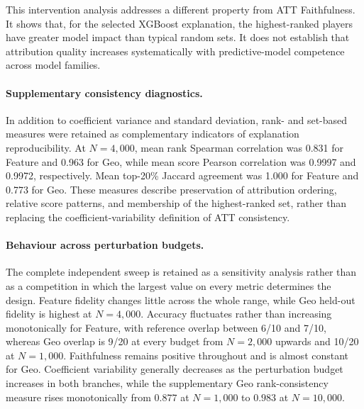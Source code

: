 This intervention analysis addresses a different property from ATT
Faithfulness. It shows that, for the selected XGBoost explanation, the
highest-ranked players have greater model impact than typical random sets.
It does not establish that attribution quality increases systematically with
predictive-model competence across model families.
\paragraph{Supplementary consistency diagnostics.}
In addition to coefficient variance and standard deviation, rank- and
set-based measures were retained as complementary indicators of explanation
reproducibility. At $N=4{,}000$, mean rank Spearman correlation was 0.831 for
Feature and 0.963 for Geo, while mean score Pearson correlation was 0.9997 and
0.9972, respectively. Mean top-20\% Jaccard agreement was 1.000 for Feature and
0.773 for Geo. These measures describe preservation of attribution ordering,
relative score patterns, and membership of the highest-ranked set, rather than
replacing the coefficient-variability definition of ATT consistency.

\paragraph{Behaviour across perturbation budgets.}
The complete independent sweep is retained as a sensitivity analysis rather
than as a competition in which the largest value on every metric determines
the design. Feature fidelity changes little across the whole range, while Geo
held-out fidelity is highest at $N=4{,}000$. Accuracy fluctuates rather than
increasing monotonically for Feature, with reference overlap between 6/10 and
7/10, whereas Geo overlap is 9/20 at every budget from $N=2{,}000$ upwards and
10/20 at $N=1{,}000$. Faithfulness remains positive throughout and is almost
constant for Geo. Coefficient variability generally decreases as the
perturbation budget increases in both branches, while the supplementary
Geo rank-consistency measure rises monotonically from $0.877$ at $N=1{,}000$ to
$0.983$ at $N=10{,}000$.

